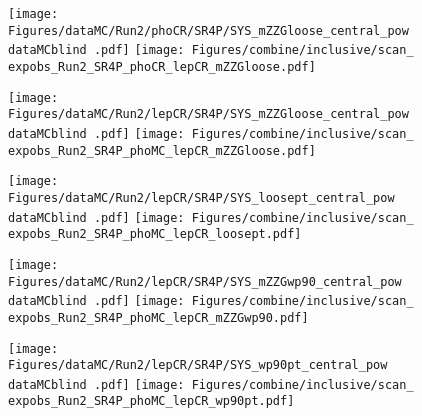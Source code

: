 \label{sec:likelihood_scans_inclusive}

\begin{figure}
  \centering
  \texttt{[image: Figures/dataMC/Run2/phoCR/SR4P/SYS\_mZZGloose\_central\_pow\\dataMCblind .pdf]}
  \hfill
  \texttt{[image: Figures/combine/inclusive/scan\_\\expobs\_Run2\_SR4P\_phoCR\_lepCR\_mZZGloose.pdf]}
  \caption{}
  \label{fig:scan_Run2_SR4P_phoCR_lepCR_mZZGloose}
\end{figure}

\begin{figure}
  \centering
  \texttt{[image: Figures/dataMC/Run2/lepCR/SR4P/SYS\_mZZGloose\_central\_pow\\dataMCblind .pdf]}
  \hfill
  \texttt{[image: Figures/combine/inclusive/scan\_\\expobs\_Run2\_SR4P\_phoMC\_lepCR\_mZZGloose.pdf]}
  \caption{}
  \label{fig:scan_Run2_SR4P_phoMC_lepCR_mZZGloose}
\end{figure}

\begin{figure}
  \centering
  \texttt{[image: Figures/dataMC/Run2/lepCR/SR4P/SYS\_loosept\_central\_pow\\dataMCblind .pdf]}
  \hfill
  \texttt{[image: Figures/combine/inclusive/scan\_\\expobs\_Run2\_SR4P\_phoMC\_lepCR\_loosept.pdf]}
  \caption{}
  \label{fig:scan_Run2_SR4P_phoMC_lepCR_loosept}
\end{figure}

\begin{figure}
  \centering
  \texttt{[image: Figures/dataMC/Run2/lepCR/SR4P/SYS\_mZZGwp90\_central\_pow\\dataMCblind .pdf]}
  \hfill
  \texttt{[image: Figures/combine/inclusive/scan\_\\expobs\_Run2\_SR4P\_phoMC\_lepCR\_mZZGwp90.pdf]}
  \caption{}
  \label{fig:scan_Run2_SR4P_phoMC_lepCR_mZZGwp90}
\end{figure}

\begin{figure}
  \centering
  \texttt{[image: Figures/dataMC/Run2/lepCR/SR4P/SYS\_wp90pt\_central\_pow\\dataMCblind .pdf]}
  \hfill
  \texttt{[image: Figures/combine/inclusive/scan\_\\expobs\_Run2\_SR4P\_phoMC\_lepCR\_wp90pt.pdf]}
  \caption{}
  \label{fig:scan_Run2_SR4P_phoMC_lepCR_wp90pt}
\end{figure}

